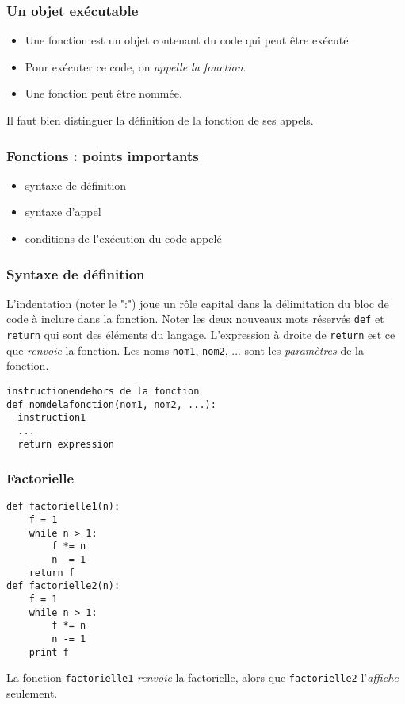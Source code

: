 


\begin{frame}
  \frametitle{Un objet exécutable}
\begin{itemize}
  \item Une fonction est un objet contenant du code qui peut être exécuté.
  \item Pour exécuter ce code, on \emph{appelle la fonction}.
  \item Une fonction peut être nommée.
\end{itemize}
Il faut bien distinguer la définition de la fonction de ses appels.
\end{frame}

\begin{frame}
  \frametitle{Fonctions : points importants}
\begin{itemize}
  \item syntaxe de définition
  \item syntaxe d'appel
  \item conditions de l'exécution du code appelé
\end{itemize}
\end{frame}


\begin{frame}[fragile]
  \frametitle{Syntaxe de définition}
L'indentation (noter le ":") joue un rôle capital dans la délimitation du bloc de code à inclure dans la fonction.\newline
Noter les deux nouveaux mots réservés \texttt{def} et \texttt{return} qui sont des éléments du langage.\newline
L'expression à droite de \texttt{return} est ce que \emph{renvoie} la fonction.\newline
Les noms \texttt{nom1}, \texttt{nom2}, ... sont les \emph{paramètres} de la fonction.
\begin{verbatim}
instructionendehors de la fonction
def nomdelafonction(nom1, nom2, ...):
  instruction1
  ...
  return expression
\end{verbatim}
\end{frame}

\begin{frame}[fragile]
  \frametitle{Factorielle}
\begin{verbatim}
def factorielle1(n):
    f = 1
    while n > 1:
        f *= n
        n -= 1
    return f
def factorielle2(n):
    f = 1
    while n > 1:
        f *= n
        n -= 1
    print f
\end{verbatim}
La fonction \texttt{factorielle1} \emph{renvoie} la factorielle, alors que \texttt{factorielle2} l'\emph{affiche} seulement.
\end{frame}

